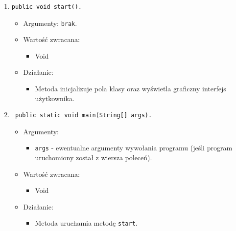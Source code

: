 \documentclass[a4paper,11pt, notitlepage ]{article}
\begin{document}
\begin{enumerate}
\item \begin{verbatim}public void start(). \end{verbatim}
\begin{itemize}
\item Argumenty: \verb+brak+.
\item Wartość zwracana:
\begin{itemize}
\item Void
\end{itemize}
\item Działanie:
\begin{itemize}
\item Metoda inicjalizuje pola klasy oraz wyświetla graficzny interfejs użytkownika.
\end{itemize}
\end{itemize}


\item \begin{verbatim} public static void main(String[] args). \end{verbatim}
\begin{itemize}
\item Argumenty:
\begin{itemize}
\item \verb+args+ - ewentualne argumenty wywołania programu (jeśli program uruchomiony został z wiersza poleceń).
\end{itemize}
\item Wartość zwracana:
\begin{itemize}
\item Void
\end{itemize}
\item Działanie:
\begin{itemize}
\item Metoda uruchamia metodę \verb+start+.
\end{itemize}
\end{itemize}




\end{enumerate}
\end{document}

